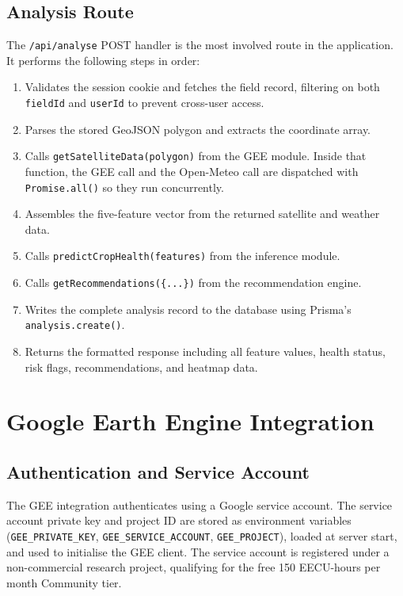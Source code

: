 \subsection{Analysis Route}

The \texttt{/api/analyse} POST handler is the most involved route in the application. It performs the following steps in order:

\begin{enumerate}
  \item Validates the session cookie and fetches the field record, filtering on both \texttt{fieldId} and \texttt{userId} to prevent cross-user access.
  \item Parses the stored GeoJSON polygon and extracts the coordinate array.
  \item Calls \texttt{getSatelliteData(polygon)} from the GEE module. Inside that function, the GEE call and the Open-Meteo call are dispatched with \texttt{Promise.all()} so they run concurrently.
  \item Assembles the five-feature vector from the returned satellite and weather data.
  \item Calls \texttt{predictCropHealth(features)} from the inference module.
  \item Calls \texttt{getRecommendations(\{...\})} from the recommendation engine.
  \item Writes the complete analysis record to the database using Prisma's \texttt{analysis.create()}.
  \item Returns the formatted response including all feature values, health status, risk flags, recommendations, and heatmap data.
\end{enumerate}

\section{Google Earth Engine Integration}

\subsection{Authentication and Service Account}

The GEE integration authenticates using a Google service account. The service account private key and project ID are stored as environment variables (\texttt{GEE\_PRIVATE\_KEY}, \texttt{GEE\_SERVICE\_ACCOUNT}, \texttt{GEE\_PROJECT}), loaded at server start, and used to initialise the GEE client. The service account is registered under a non-commercial research project, qualifying for the free 150 EECU-hours per month Community tier. \citep{gorelick2017}

